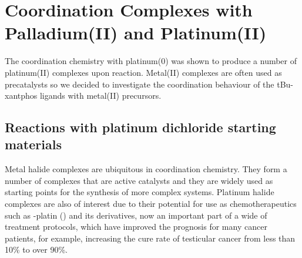 
\chapter{Coordination Complexes with Palladium(II) and Platinum(II)}
\label{ch:platinumII}







The coordination chemistry with platinum(0) was shown to produce a number of platinum(II) complexes upon reaction.  Metal(II) complexes are often used as precatalysts so we decided to investigate the coordination behaviour of the tBu-xantphos ligands with metal(II) precursors.  


\section{Reactions with platinum dichloride starting materials}

Metal halide complexes are ubiquitous in coordination chemistry.  They form a number of complexes that are active catalysts and they are widely used as starting points for the synthesis of more complex systems.  Platinum halide complexes are also of interest due to their potential for use as chemotherapeutics such as \cis-platin (\ce{[PtCl2(NH3)2]}) and its derivatives, now an important part of a wide of treatment protocols, which have improved the prognosis for many cancer patients, for example, increasing the cure rate of testicular cancer from less than 10\%{} to over 90\%.\cite{Wilson2013}

